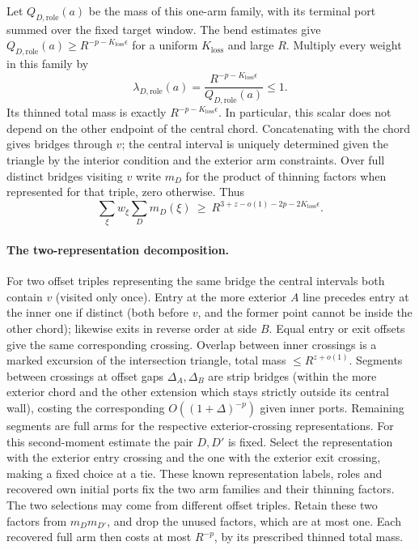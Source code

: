Let $Q_{D,\mathrm{role}}(a)$ be the mass of this one-arm family, with its
terminal port summed over the fixed target window.  The bend estimates
give $Q_{D,\mathrm{role}}(a)\ge R^{-p-K_{\mathrm{loss}}\epsilon}$ for a uniform $K_{\mathrm{loss}}$
and large $R$.  Multiply every weight in this family by
\[
 \lambda_{D,\mathrm{role}}(a)
 =\frac{R^{-p-K_{\mathrm{loss}}\epsilon}}{Q_{D,\mathrm{role}}(a)}\le1.
\]
Its thinned total mass is exactly $R^{-p-K_{\mathrm{loss}}\epsilon}$.  In particular,
this scalar does not depend on the other endpoint of the central chord. Concatenating with the chord gives bridges through \(v\); the central interval is uniquely determined given the triangle by the interior condition and the exterior arm constraints. Over full distinct bridges visiting \(v\) write \(m_D\) for the product of thinning factors when represented for that triple, zero otherwise. Thus
\[
 \sum_\xi w_\xi\sum_D m_D(\xi)\ \ge\ R^{3+z-o(1)-2p-2K_{\mathrm{loss}}\epsilon}.
\]
\paragraph{The two-representation decomposition.}
For two offset triples representing the same bridge the central intervals both contain \(v\) (visited only once). Entry at the more exterior \(A\) line precedes entry at the inner one if distinct (both before \(v\), and the former point cannot be inside the other chord); likewise exits in reverse order at side \(B\). Equal entry or exit offsets give the same corresponding crossing. Overlap between inner crossings is a marked excursion of the intersection triangle, total mass \(\le R^{z+o(1)}\). Segments between crossings at offset gaps \(\Delta_A,\Delta_B\) are strip bridges (within the more exterior chord and the other extension which stays strictly outside its central wall), costing the corresponding \(O((1+\Delta)^{-p})\) given inner ports. Remaining segments are full arms for the respective exterior-crossing representations.  For this second-moment estimate the pair \(D,D'\) is fixed. Select the
representation with the exterior entry crossing and the one with the
exterior exit crossing, making a fixed choice at a tie. These known
representation labels, roles and recovered own initial ports fix the
two arm families and their thinning factors. The two selections may
come from different offset triples. Retain these two factors from \(m_Dm_{D'}\), and drop the unused
factors, which are at most one. Each recovered full arm then costs at most
\(R^{-p}\), by its prescribed thinned total mass.

